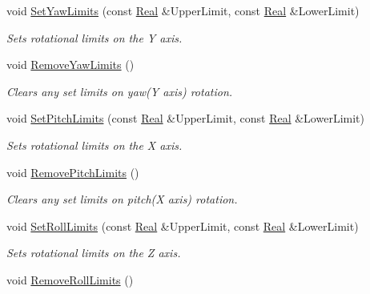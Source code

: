 \begin{DoxyCompactItemize}
void \hyperlink{classphys_1_1CameraController_a0c19fba402f176361aea139ead5a9a40}{SetYawLimits} (const \hyperlink{namespacephys_af7eb897198d265b8e868f45240230d5f}{Real} \&UpperLimit, const \hyperlink{namespacephys_af7eb897198d265b8e868f45240230d5f}{Real} \&LowerLimit)
\begin{DoxyCompactList}\small\item\em Sets rotational limits on the Y axis. \item\end{DoxyCompactList}\item 
\hypertarget{classphys_1_1CameraController_a356fa13a243b5f3645576b9b857ce085}{
void \hyperlink{classphys_1_1CameraController_a356fa13a243b5f3645576b9b857ce085}{RemoveYawLimits} ()}
\label{classphys_1_1CameraController_a356fa13a243b5f3645576b9b857ce085}

\begin{DoxyCompactList}\small\item\em Clears any set limits on yaw(Y axis) rotation. \item\end{DoxyCompactList}\item 
void \hyperlink{classphys_1_1CameraController_a9ca0500582f46a20189cdc39555b79b3}{SetPitchLimits} (const \hyperlink{namespacephys_af7eb897198d265b8e868f45240230d5f}{Real} \&UpperLimit, const \hyperlink{namespacephys_af7eb897198d265b8e868f45240230d5f}{Real} \&LowerLimit)
\begin{DoxyCompactList}\small\item\em Sets rotational limits on the X axis. \item\end{DoxyCompactList}\item 
\hypertarget{classphys_1_1CameraController_a19478dd2688262f9652410a630dfa731}{
void \hyperlink{classphys_1_1CameraController_a19478dd2688262f9652410a630dfa731}{RemovePitchLimits} ()}
\label{classphys_1_1CameraController_a19478dd2688262f9652410a630dfa731}

\begin{DoxyCompactList}\small\item\em Clears any set limits on pitch(X axis) rotation. \item\end{DoxyCompactList}\item 
void \hyperlink{classphys_1_1CameraController_a047f16cf47f9648472db34fc8337bd45}{SetRollLimits} (const \hyperlink{namespacephys_af7eb897198d265b8e868f45240230d5f}{Real} \&UpperLimit, const \hyperlink{namespacephys_af7eb897198d265b8e868f45240230d5f}{Real} \&LowerLimit)
\begin{DoxyCompactList}\small\item\em Sets rotational limits on the Z axis. \item\end{DoxyCompactList}\item 
\hypertarget{classphys_1_1CameraController_ad2ea07b9eb9c4ebc1d753a7376c307b3}{
void \hyperlink{classphys_1_1CameraController_ad2ea07b9eb9c4ebc1d753a7376c307b3}{RemoveRollLimits} ()}
\label{classphys_1_1CameraController_ad2ea07b9eb9c4ebc1d753a7376c307b3}


\end{DoxyCompactItemize}
